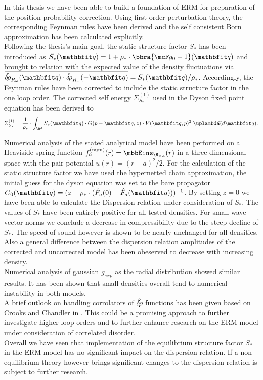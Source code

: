 In this thesis we have been able to build a foundation of ERM for preparation of the position probability correction. Using first order perturbation theory, the corresponding Feynman rules have been derived and the self consistent Born approximation has been calculated explicitly. \\

Following the thesis's main goal, the static structure factor $S_*$ has been introduced as $S_*(\vq) = 1 + \rho_*\cdot\bbra{\mcF g_0 - 1}(\vq)$ and brought to relation with the expected value of the density fluctuations via $\overline{\hat\drho_{R_\omega}(\vq)\cdot \hat\drho_{R_\omega}(-\vq)} = S_*(\vq)/\rho_*$. Accordingly, the Feynman rules have been corrected to include the static structure factor in the one loop order. The corrected self energy $\Sigma_{S_*}^{(1)}$ used in the Dyson fixed point equation has been derived to 
\[
    \Sigma_{S_*}^{(1)} = \frac{1}{\rho_*}\cdot\int_{\R^d}S_*(\vq)\cdot G(p-\vq,z)\cdot V(\vq,p)^2\;\uplambdabar(d\vq).
\]

Numerical analysis of the stated analytical model have been performed on a Heaviside spring function $f_a^{(\text{num})}(r) = \mbbEins_{\R_{<a}}(r)$ in a three dimensional space with the pair potential $u(r) = (r - a)^2/2$. For the calculation of the static structure factor we have used the hypernetted chain approximation, the initial guess for the dyson equation was set to the bare propagator $G_0(\vq) = (z - \rho_*\cdot(\hat F_a(0) - \hat F_a(\vq)))^{-1}$. By setting $z = 0$ we have been able to calculate the Dispersion relation under consideration of $S_*$. The values of $S_*$ have been entirely positive for all tested densities. For small wave vector norms we conclude a decrease in compressibility due to the steep decline of $S_*$. The speed of sound however is shown to be nearly unchanged for all densities. Also a general difference between the dispersion relation amplitudes of the corrected and uncorrected model has been obeserved to decrease with increasing density. \\

Numerical analysis of gaussian $g_{\mathit{exp}}$ as the radial distribution showed similar results. It has been shown that small densities overall tend to numerical instability in both models. \\

A brief outlook on handling corrolators of $\hat{\delta\hspace*{-0.15em}\rho}$ functions has been given based on Crooks and Chandler in \cite{PhysRevE.56.4217}. This could be a promising approach to further investigate higher loop orders and to further enhance research on the ERM model under consideration of correlated disorder. \\

Overall we have seen that implementation of the equilibrium structure factor $S_*$ in the ERM model has no significant impact on the dispersion relation. If a non-equilibrium theory however brings significant changes to the dispersion relation is subject to further research. 